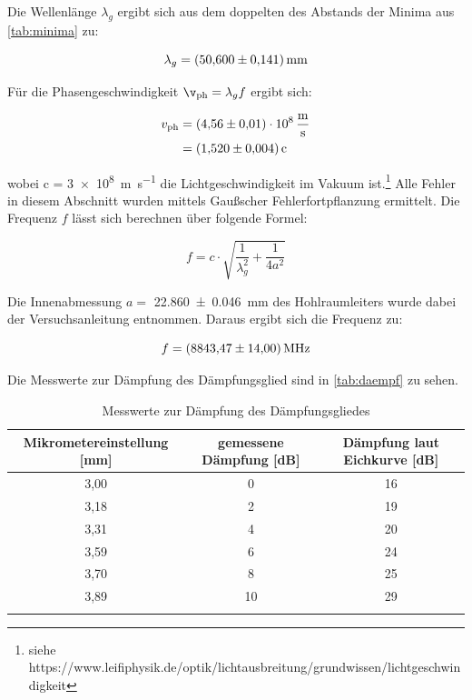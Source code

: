 Die Wellenlänge $\lambda_g$ ergibt sich aus dem doppelten des Abstands der Minima aus \autoref{tab:minima} zu:

\begin{equation}
\lambda_g = \SI{50,6\pm0,141}{\milli\metre}
\label{eq:wellenlaenge}
\end{equation}

Für die Phasengeschwindigkeit $\v_\text{ph} = \lambda_g f$ ergibt sich:

\begin{equation} \label{eq:phasengeschw}
\begin{split}
v_\text{ph} & = \SI{4,56\pm0,01e+8}{\metre\per\second} \\
 & = \SI{1,520\pm0,004}{c}
\end{split}
\end{equation}

wobei c = \SI{3e8}{\metre\per\second} die Lichtgeschwindigkeit im Vakuum ist.\footnote{siehe https://www.leifiphysik.de/optik/lichtausbreitung/grundwissen/lichtgeschwindigkeit}
Alle Fehler in diesem Abschnitt wurden mittels Gaußscher Fehlerfortpflanzung ermittelt.
Die Frequenz $f$ lässt sich berechnen über folgende Formel:

\begin{equation}
f = c\cdot\sqrt{ \frac{1}{\lambda_g^2} + \frac{1}{4a^2}}
\label{eq:freq}
\end{equation}

Die Innenabmessung $a =$ \SI{22,860\pm0,046}{\milli\metre} des Hohlraumleiters wurde dabei der Versuchsanleitung entnommen.
Daraus ergibt sich die Frequenz zu:

\begin{equation}
f = \SI{8843,47\pm14}{\mega\hertz}
\label{eq:freq2}
\end{equation}

Die Messwerte zur Dämpfung des Dämpfungsglied sind in \autoref{tab:daempf} zu sehen.


\begin{table}
\centering
\caption{Messwerte zur Dämpfung des Dämpfungsgliedes}
\begin{tabular}{c c c}
\toprule
{Mikrometereinstellung [mm]} & {gemessene Dämpfung [dB]} & {Dämpfung laut Eichkurve [dB]}\\
\midrule
3,00	&0	&16\\
3,18	&2	&19\\
3,31	&4	&20\\
3,59	&6	&24\\
3,70	&8	&25\\
3,89	&10	&29\\

\bottomrule
\label{tab:daempf}
\end{tabular}
\end{table}

